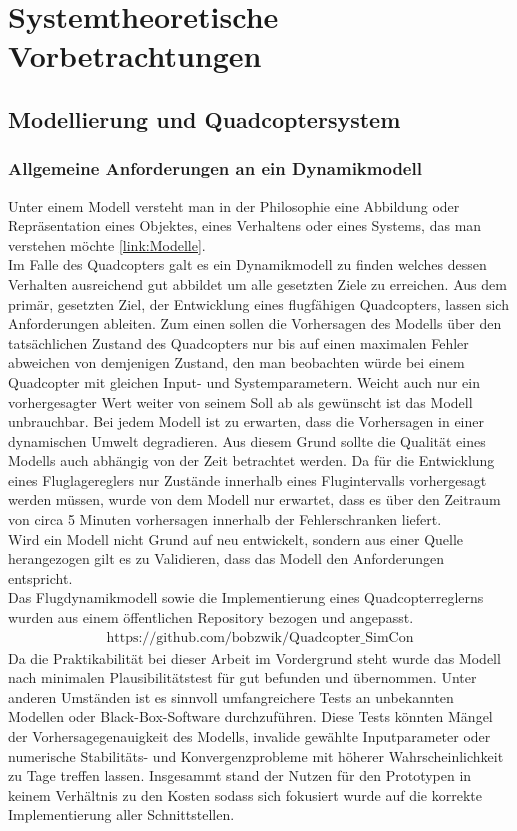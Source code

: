 \section{Systemtheoretische Vorbetrachtungen}
\subsection{Modellierung und Quadcoptersystem}
\subsubsection{Allgemeine Anforderungen an ein Dynamikmodell}
Unter einem Modell versteht man in der Philosophie eine Abbildung oder Repräsentation eines Objektes, eines Verhaltens oder eines Systems, das man verstehen möchte \ref{link:Modelle}.\\
Im Falle des Quadcopters galt es ein Dynamikmodell zu finden welches dessen Verhalten ausreichend gut abbildet um alle gesetzten Ziele zu erreichen. Aus dem primär, gesetzten Ziel, der Entwicklung eines flugfähigen Quadcopters, lassen sich Anforderungen ableiten.
Zum einen sollen die Vorhersagen des Modells über den tatsächlichen Zustand des Quadcopters nur bis auf einen maximalen Fehler abweichen von demjenigen Zustand, den man beobachten würde bei einem Quadcopter mit gleichen Input- und Systemparametern. Weicht auch nur ein vorhergesagter Wert weiter von seinem Soll ab als gewünscht ist das Modell unbrauchbar. Bei jedem Modell ist zu erwarten, dass die Vorhersagen in einer dynamischen Umwelt degradieren. Aus diesem Grund sollte die Qualität eines Modells auch abhängig von der Zeit betrachtet werden. Da für die Entwicklung eines Fluglagereglers nur Zustände innerhalb eines Flugintervalls vorhergesagt werden müssen, wurde von dem Modell nur erwartet, dass es über den Zeitraum von circa 5 Minuten vorhersagen innerhalb der Fehlerschranken liefert.\\
Wird ein Modell nicht Grund auf neu entwickelt, sondern aus einer Quelle herangezogen gilt es zu Validieren, dass das Modell den Anforderungen entspricht.\\
Das Flugdynamikmodell sowie die Implementierung eines Quadcopterreglerns wurden aus einem öffentlichen Repository bezogen und angepasst.
\begin{align}
	\label{simcon:simcon}\text{https://github.com/bobzwik/Quadcopter\_SimCon}
\end{align}
Da die Praktikabilität bei dieser Arbeit im Vordergrund steht wurde das Modell nach minimalen Plausibilitätstest für gut befunden und übernommen. Unter anderen Umständen ist es sinnvoll umfangreichere Tests an unbekannten Modellen oder Black-Box-Software durchzuführen.
Diese Tests könnten Mängel der Vorhersagegenauigkeit des Modells, invalide gewählte Inputparameter oder numerische Stabilitäts- und Konvergenzprobleme mit höherer Wahrscheinlichkeit zu Tage treffen lassen. Insgesammt stand der Nutzen für den Prototypen in keinem Verhältnis zu den Kosten sodass sich fokusiert wurde auf die korrekte Implementierung aller Schnittstellen. 
